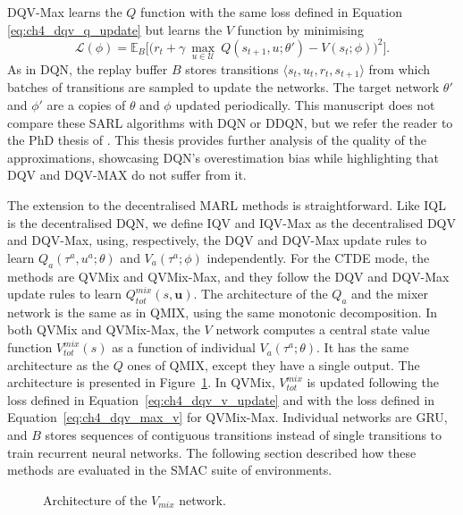 DQV-Max learns the $Q$ function with the same loss defined in Equation \eqref{eq:ch4_dqv_q_update} but learns the $V$ function by minimising
\begin{equation}
        \mathcal{L}(\phi) = \mathbb{E}_{B} \bigg[\big(r_{t} + \gamma \: \underset{u\in \mathcal{U}}{\max}\: Q(s_{t+1}, u; \theta') - V(s_{t}; \phi)\big)^{2}\bigg].
        \label{eq:ch4_dqv_max_v}
\end{equation}
As in DQN, the replay buffer $B$ stores transitions $\langle s_{t},u_{t},r_{t},s_{t+1}\rangle$ from which batches of transitions are sampled to update the networks.
The target network $\theta'$ and $\phi'$ are a copies of $\theta$ and $\phi$ updated periodically.
This manuscript does not compare these SARL algorithms with DQN or DDQN, but we refer the reader to the PhD thesis of \cite{thesis_matthia}.
This thesis provides further analysis of the quality of the approximations, showcasing DQN's overestimation bias while highlighting that DQV and DQV-MAX do not suffer from it.

The extension to the decentralised MARL methods is straightforward.
Like IQL is the decentralised DQN, we define IQV and IQV-Max as the decentralised DQV and DQV-Max, using, respectively, the DQV and DQV-Max update rules to learn $Q_a(\tau^a, u^a;\theta)$ and $V_a(\tau^a;\phi)$ independently.
For the CTDE mode, the methods are QVMix and QVMix-Max, and they follow the DQV and DQV-Max update rules to learn $Q^{mix}_{tot}(s, \mathbf{u})$.
The architecture of the $Q_a$ and the mixer network is the same as in QMIX, using the same monotonic decomposition.
In both QVMix and QVMix-Max, the $V$ network computes a central state value function $V^{mix}_{tot}(s)$ as a function of individual $V_a(\tau^a;\theta)$.
It has the same architecture as the $Q$ ones of QMIX, except they have a single output. 
The architecture is presented in Figure~\ref{fig:ch4_qvmix}.
In QVMix, $V^{mix}_{tot}$ is updated following the loss defined in Equation~\ref{eq:ch4_dqv_v_update} and with the loss defined in Equation~\ref{eq:ch4_dqv_max_v} for QVMix-Max.
Individual networks are GRU, and $B$ stores sequences of contiguous transitions instead of single transitions to train recurrent neural networks.
The following section described how these methods are evaluated in the SMAC suite of environments. 

\begin{figure}
\centering

\caption{Architecture of the $V_{mix}$ network.}
\label{fig:ch4_qvmix}
\end{figure}




